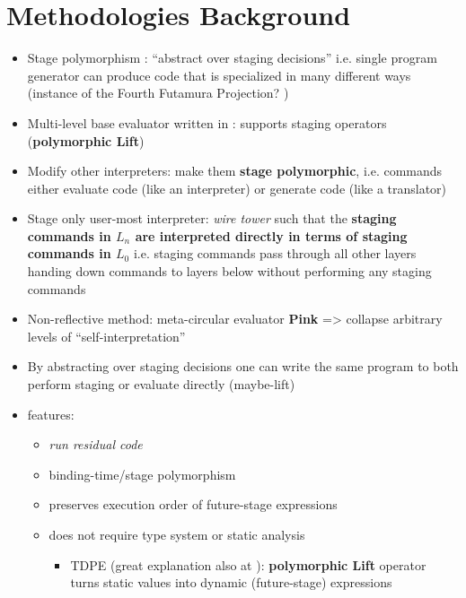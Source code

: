 \documentclass{article}
\theoremstyle{definition}
\begin{document}
\section{Methodologies Background}
\begin{itemize}
	\item Stage polymorphism \cite{ofenbeck2017staging}: ``abstract over staging decisions'' i.e. single program generator can produce code that is specialized in many different ways (instance of the Fourth Futamura Projection? \cite{gluck2009there}) 
	\item Multi-level base evaluator written in \mslang: supports staging operators (\textbf{polymorphic Lift})
	\item Modify other interpreters: make them \textbf{stage polymorphic}, i.e. commands either evaluate code (like an interpreter) or generate code (like a translator)
	\item Stage only user-most interpreter: \textit{wire tower} such that the \textbf{staging commands in $L_{n}$ are interpreted directly in terms of staging commands in $L_{0}$} i.e. staging commands pass through all other layers handing down commands to layers below without performing any staging commands
	\item Non-reflective method: meta-circular evaluator \textbf{Pink} => collapse arbitrary levels of ``self-interpretation''
	\item By abstracting over staging decisions one can write the same program to both perform staging or evaluate directly \cite{amin2017collapsing} (maybe-lift)
	\item \mslang features:
	\begin{itemize}
		\item \textit{run residual code}
		\item binding-time/stage polymorphism \cite{henglein1994polymorphic}
		\item preserves execution order of future-stage expressions
		\item does not require type system or static analysis
		\begin{itemize}
			\item TDPE \cite{danvy1999type} (great explanation also at \cite{grobauer2001second}): \textbf{polymorphic Lift} operator turns static values into dynamic (future-stage) expressions
		\end{itemize}
	\end{itemize}
\end{itemize}
\end{document}
